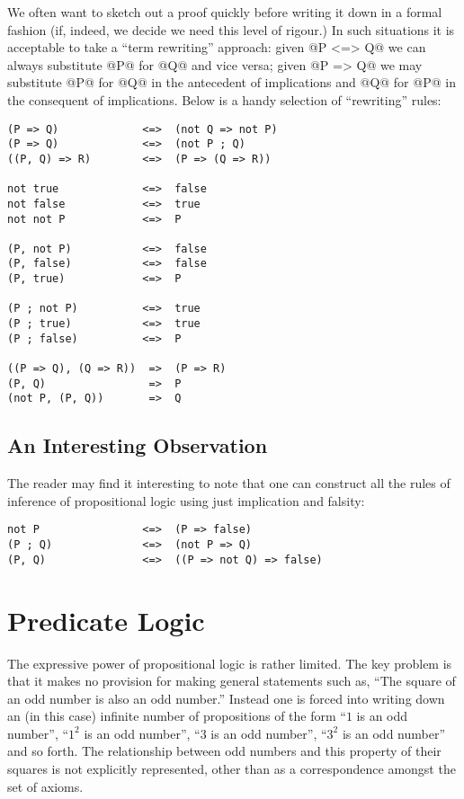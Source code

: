 We often want to sketch out a proof quickly before writing it down in a
formal fashion (if, indeed, we decide we need this level of rigour.)  In
such situations it is acceptable to take a ``term rewriting'' approach:
given @P <=> Q@ we can always substitute @P@ for @Q@ and vice versa;
given @P => Q@ we may substitute @P@ for @Q@ in the antecedent of
implications and @Q@ for @P@ in the consequent of implications.  Below
is a handy selection of ``rewriting'' rules:
\begin{verbatim}
(P => Q)             <=>  (not Q => not P)
(P => Q)             <=>  (not P ; Q)
((P, Q) => R)        <=>  (P => (Q => R))

not true             <=>  false
not false            <=>  true
not not P            <=>  P

(P, not P)           <=>  false
(P, false)           <=>  false
(P, true)            <=>  P

(P ; not P)          <=>  true
(P ; true)           <=>  true
(P ; false)          <=>  P

((P => Q), (Q => R))  =>  (P => R)
(P, Q)                =>  P
(not P, (P, Q))       =>  Q
\end{verbatim}

\subsection{An Interesting Observation}

The reader may find it interesting to note that one can construct all
the rules of inference of propositional logic using just implication and
falsity:
\begin{verbatim}
not P                <=>  (P => false)
(P ; Q)              <=>  (not P => Q)
(P, Q)               <=>  ((P => not Q) => false)
\end{verbatim}

\section{Predicate Logic}

The expressive power of propositional logic is rather limited.  The key
problem is that it makes no provision for making general statements such
as, ``The square of an odd number is also an odd number.''  Instead one
is forced into writing down an (in this case) infinite number of
propositions of the form ``$1$ is an odd number'', ``$1^2$ is an odd
number'', ``$3$ is an odd number'', ``$3^2$ is an odd number'' and so
forth.  The relationship between odd numbers and this property of their
squares is not explicitly represented, other than as a correspondence
amongst the set of axioms.

